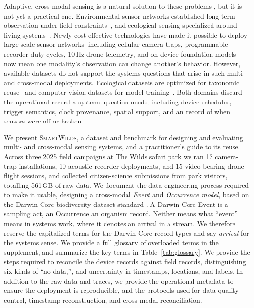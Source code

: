 \documentclass[sigconf]{acmart}
\newcommand{\smartwilds}{\textsc{SmartWilds}\xspace}
\begin{document}
Adaptive, cross-modal sensing is a natural solution to these problems \cite{pollock2026roam}, but it is not yet a practical one.
Environmental sensor networks established long-term observation under field constraints~\cite{metzger2019neon,staccone2021neon}, and ecological sensing specialized around living systems~\cite{lahozmonfort2021monitoring}.
Newly cost-effective technologies have made it possible to deploy large-scale sensor networks, including cellular camera traps,
programmable recorder duty cycles, 10\,Hz drone telemetry, and
on-device foundation models now mean one modality's observation can
change another's behavior. 
However, available datasets do not support the systems questions that arise in such multi- and cross-modal deployments.
Ecological datasets are optimized for taxonomic reuse~\cite{wieczorek2012darwincore,ahumada2020wildlifeinsights} and
computer-vision datasets for model training~\cite{liang2021multibench}.
Both domains discard the operational record a systems question needs, including device
schedules, trigger semantics, clock provenance, spatial support, and an
record of when sensors were off or broken.  

We present \smartwilds, a dataset and benchmark for designing and evaluating multi- and cross-modal sensing systems, and a practitioner's guide to its reuse.
Across three 2025 field campaigns at The Wilds safari park we ran 13 camera-trap installations, 10 acoustic recorder deployments, and 15 video-bearing drone flight sessions, and collected
citizen-science submissions from park visitors, totalling 561\,GB of raw data.
We document the data engineering process required to make it usable, designing a cross-modal \textit{Event} and \textit{Occurrence model}, based on the Darwin Core biodiversity dataset standard \cite{wieczorek2012darwincore,tdwgDarwinCore}.
A Darwin Core Event is a sampling act, an Occurrence an organism record. 
Neither means what ``event'' means in systems work, where it denotes an arrival in a stream. 
We therefore reserve the capitalized terms for the Darwin Core
record types and say \emph{arrival} for the systems sense.
We provide a full glossary of overloaded terms in the supplement, and summarize the key terms in Table~\ref{tab:glossary}.
We provide the steps required to reconcile the device records against field records, distinguishing six kinds of ``no data,'', and uncertainty in timestamps, locations, and labels.
In addition to the raw data and traces, we provide the operational metadata to ensure the deployment is reproducible, and the protocols used for data quality control, timestamp reconstruction, and cross-modal reconciliation.
%
\end{document}
